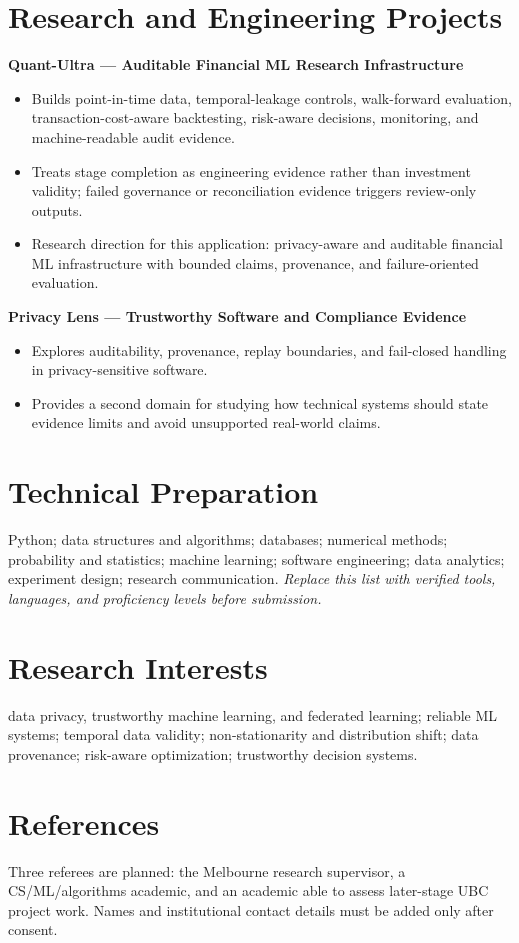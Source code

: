 \documentclass[11pt]{article}
\begin{document}
\section*{Research and Engineering Projects}
\textbf{Quant-Ultra --- Auditable Financial ML Research Infrastructure}
\begin{itemize}
\item Builds point-in-time data, temporal-leakage controls, walk-forward evaluation, transaction-cost-aware backtesting, risk-aware decisions, monitoring, and machine-readable audit evidence.
\item Treats stage completion as engineering evidence rather than investment validity; failed governance or reconciliation evidence triggers review-only outputs.
\item Research direction for this application: privacy-aware and auditable financial ML infrastructure with bounded claims, provenance, and failure-oriented evaluation.
\end{itemize}

\begin{samepage}
\textbf{Privacy Lens --- Trustworthy Software and Compliance Evidence}
\begin{itemize}
\item Explores auditability, provenance, replay boundaries, and fail-closed handling in privacy-sensitive software.
\item Provides a second domain for studying how technical systems should state evidence limits and avoid unsupported real-world claims.
\end{itemize}
\end{samepage}

\section*{Technical Preparation}
Python; data structures and algorithms; databases; numerical methods; probability and statistics; machine learning; software engineering; data analytics; experiment design; research communication. \textit{Replace this list with verified tools, languages, and proficiency levels before submission.}

\section*{Research Interests}
data privacy, trustworthy machine learning, and federated learning; reliable ML systems; temporal data validity; non-stationarity and distribution shift; data provenance; risk-aware optimization; trustworthy decision systems.

\section*{References}
Three referees are planned: the Melbourne research supervisor, a CS/ML/algorithms academic, and an academic able to assess later-stage UBC project work. Names and institutional contact details must be added only after consent.
\end{document}
